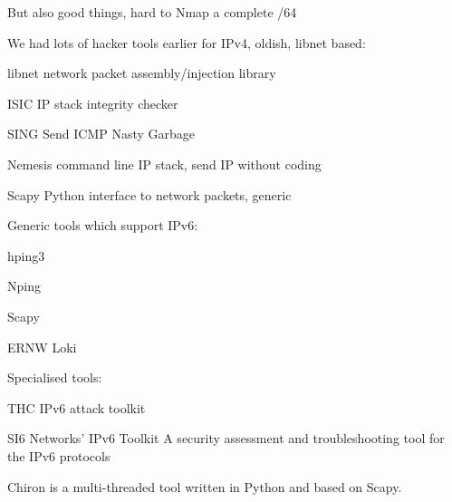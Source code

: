 \documentclass[18pt,landscape,a4paper,footrule]{foils}
\begin{document}
But also good things, hard to Nmap a complete /64 \smiley


We had lots of hacker tools earlier for IPv4, oldish, libnet based:
\begin{list2}
\item libnet network packet assembly/injection library
\item ISIC IP stack integrity checker
\item SING Send ICMP Nasty Garbage
\item Nemesis command line IP stack, send IP without coding
\item Scapy Python interface to network packets, generic
\end{list2}


Generic tools which support IPv6:
\begin{list2}
\item hping3 
\item Nping 
\item Scapy 
\item ERNW Loki 
\end{list2}

Specialised tools:

\begin{list2}
\item THC IPv6 attack toolkit 
\item SI6 Networks' IPv6 Toolkit A security assessment and troubleshooting tool for the IPv6 protocols\\
\item Chiron is a multi-threaded tool written in Python and based on Scapy. 
\end{list2}

\end{document}
